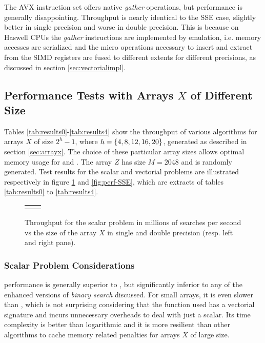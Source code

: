 \documentclass[preprint,1p,times]{elsarticle}
\begin{document}
The AVX instruction set offers native \textit{gather} operations, but performance is generally disappointing. Throughput is nearly identical to the SSE case, slightly better in single precision and worse in double precision. This is because on Haswell CPUs the \textit{gather} instructions are implemented by emulation, i.e. memory accesses are serialized and the micro operations necessary to insert and extract from the SIMD registers are fused to different extents for different precisions, as discussed in section \ref{sec:vectorialimpl}.

\subsection{Performance Tests with Arrays $X$ of Different Size}
\label{sec:testthroughput}
Tables \ref{tab:results0}-\ref{tab:results4} show the throughput of various algorithms for arrays $X$ of size $2^h-1$, where $h=\left \{ 4,8,12,16,20 \right \}$, generated as described in section \ref{sec:arrayx}. The choice of these particular array sizes allows optimal memory usage for \textit{\EytzingerName} and \textit{\BitSetName}. The array $Z$ has size $M=2048$ and is randomly generated. Test results for the scalar and vectorial problems are illustrated respectively in figure \ref{fig:perf-scalar} and \ref{fig:perf-SSE}, which are extracts of tables \ref{tab:results0} to \ref{tab:results4}.

\pgfplotsset{width=6cm} 

\begin{figure}\begin{tabular}{@{\hskip1pt}c@{\hskip1pt} @{\hskip1pt}c@{\hskip1pt}}
		\perfchart{scalar}{single} & \perfchart{scalar}{double}
\end{tabular}
\vspace*{-4mm}
\caption{Throughput for the scalar problem in millions of searches per second vs the size of the array $X$ in single and double precision (resp. left and right pane).}
\label{fig:perf-scalar}\end{figure}

\subsubsection{Scalar Problem Considerations}

\textit{\MKLName} performance is generally superior to \textit{\ClassicName}, but significantly inferior to any of the enhanced versions of \textit{binary search} discussed. For small arrays, it is even slower than \textit{\ClassicName}, which is not surprising considering that the function used has a vectorial signature and incurs unnecessary overheads to deal with just a scalar. Its time complexity is better than logarithmic and it is more resilient than other algorithms to cache memory related penalties for arrays $X$ of large size.
\end{document}
